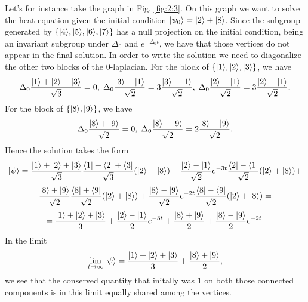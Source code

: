 \documentclass[../2.tex]{subfiles}
\begin{document}
    \begin{exa}
        Let's for instance take the graph in Fig. \ref{fig:2:3}. On this graph we want to solve the heat equation given the initial condition
        $| \psi_0 \rangle = | 2 \rangle+| 8 \rangle$. Since the subgroup generated by $\{| 4 \rangle,| 5 \rangle,| 6 \rangle,| 7 \rangle\}$ has a null projection on the initial condition, being an 
        invariant subgroup under $\Delta_0$ and $e^{-\Delta_0 t}$, we have that those vertices do not appear in the final solution.
        In order to write the solution we need to diagonalize the other two blocks of the $0$-laplacian.
        For the block of $\{| 1 \rangle,| 2 \rangle,| 3 \rangle\}$, we have 
        \[ \Delta_0 \frac{| 1 \rangle+| 2 \rangle+| 3 \rangle}{\sqrt{3}} = 0 , \;
        \Delta_0 \frac{| 3 \rangle-| 1 \rangle}{\sqrt{2}} = 3 \frac{| 3 \rangle-| 1 \rangle}{\sqrt{2}}, \;
         \Delta_0 \frac{| 2 \rangle-| 1 \rangle}{\sqrt{2}} = 3 \frac{| 2 \rangle-| 1 \rangle}{\sqrt{2}}. \]
        For the block of $\{| 8 \rangle,| 9 \rangle\}$, we have 
        \[ \Delta_0 \frac{| 8 \rangle+| 9 \rangle}{\sqrt{2}} = 0, \;
        \Delta_0 \frac{| 8 \rangle-| 9 \rangle}{\sqrt{2}} = 2 \frac{| 8 \rangle-| 9 \rangle}{\sqrt{2}}. \]
        Hence the solution takes the form
        \[ | \psi \rangle = \frac{| 1 \rangle+| 2 \rangle+| 3 \rangle}{\sqrt{3}}\frac{\langle 1 |+\langle 2 |+\langle 3 |}{\sqrt{3}}(| 2 \rangle+| 8 \rangle) + 
        \frac{| 2 \rangle-| 1 \rangle}{\sqrt{2}} e^{-3t}  \frac{\langle 2 |-\langle 1 |}{\sqrt{2}}(| 2 \rangle+| 8 \rangle) + \]
        \[ \frac{| 8 \rangle+| 9 \rangle}{\sqrt{2}}\frac{\langle 8 |+\langle 9 |}{\sqrt{2}}(| 2 \rangle+| 8 \rangle) +
        \frac{| 8 \rangle-| 9 \rangle}{\sqrt{2}}e^{-2t}\frac{\langle 8 |-\langle 9 |}{\sqrt{2}}(| 2 \rangle+| 8 \rangle) =\]
        \[ = \frac{| 1 \rangle+| 2 \rangle+| 3 \rangle}{3}+ \frac{| 2 \rangle-| 1 \rangle}{2} e^{-3t} + \frac{| 8 \rangle+| 9 \rangle}{2} + \frac{| 8 \rangle-| 9 \rangle}{2}e^{-2t}. \]
        In the limit 
        \[ \lim_{t \to \infty} | \psi \rangle = \frac{| 1 \rangle+| 2 \rangle+| 3 \rangle}{3}+\frac{| 8 \rangle+| 9 \rangle}{2}, \]
        we see that the conserved quantity that initally was $1$ on both those connected components is in this 
        limit equally shared among the vertices.
    \end{exa}
    
\end{document}
